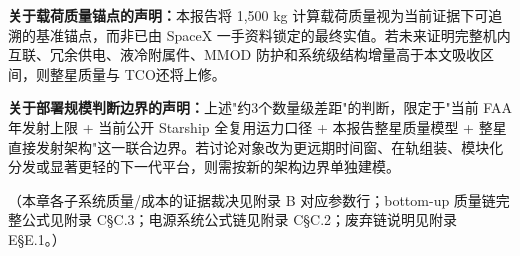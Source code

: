 \bigskip
\noindent\textbf{关于载荷质量锚点的声明：}本报告将 1,500 kg 计算载荷质量视为当前证据下可追溯的基准锚点，而非已由 SpaceX 一手资料锁定的最终实值。若未来证明完整机内互联、冗余供电、液冷附属件、MMOD 防护和系统级结构增量高于本文吸收区间，则整星质量与 TCO还将上修。

\bigskip
\noindent\textbf{关于部署规模判断边界的声明：}上述"约3个数量级差距"的判断，限定于"当前 FAA 年发射上限 + 当前公开 Starship 全复用运力口径 + 本报告整星质量模型 + 整星直接发射架构"这一联合边界。若讨论对象改为更远期时间窗、在轨组装、模块化分发或显著更轻的下一代平台，则需按新的架构边界单独建模。

（本章各子系统质量/成本的证据裁决见附录 B 对应参数行；bottom-up 质量链完整公式见附录 C\;\S C.3；电源系统公式链见附录 C\;\S C.2；废弃链说明见附录 E\;\S E.1。）

\endinput
